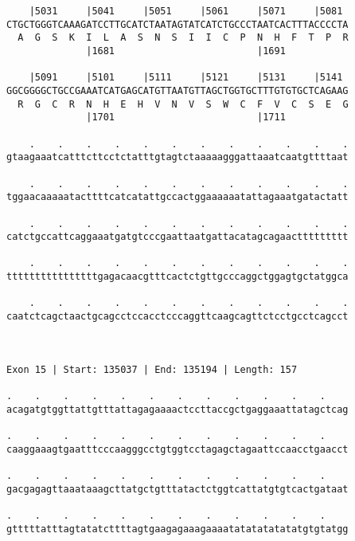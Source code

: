 \documentclass{article}
\begin{document}
\begin{Verbatim}
    |5031     |5041     |5051     |5061     |5071     |5081 
CTGCTGGGTCAAAGATCCTTGCATCTAATAGTATCATCTGCCCTAATCACTTTACCCCTA
  A  G  S  K  I  L  A  S  N  S  I  I  C  P  N  H  F  T  P  R
              |1681                         |1691           
  
    |5091     |5101     |5111     |5121     |5131     |5141 
GGCGGGGCTGCCGAAATCATGAGCATGTTAATGTTAGCTGGTGCTTTGTGTGCTCAGAAG
  R  G  C  R  N  H  E  H  V  N  V  S  W  C  F  V  C  S  E  G
              |1701                         |1711           
  
    .    .    .    .    .    .    .    .    .    .    .    .
gtaagaaatcatttcttcctctatttgtagtctaaaaagggattaaatcaatgttttaat
                                                            
    .    .    .    .    .    .    .    .    .    .    .    .
tggaacaaaaatacttttcatcatattgccactggaaaaaatattagaaatgatactatt
                                                            
    .    .    .    .    .    .    .    .    .    .    .    .
catctgccattcaggaaatgatgtcccgaattaatgattacatagcagaacttttttttt
                                                            
    .    .    .    .    .    .    .    .    .    .    .    .
ttttttttttttttttgagacaacgtttcactctgttgcccaggctggagtgctatggca
                                                            
    .    .    .    .    .    .    .    .    .    .    .    .
caatctcagctaactgcagcctccacctcccaggttcaagcagttctcctgcctcagcct
                                                            
                                                            
 
Exon 15 | Start: 135037 | End: 135194 | Length: 157
 
.    .    .    .    .    .    .    .    .    .    .    .    
acagatgtggttattgtttattagagaaaactccttaccgctgaggaaattatagctcag
                                                            
.    .    .    .    .    .    .    .    .    .    .    .    
caaggaaagtgaatttcccaagggcctgtggtcctagagctagaattccaacctgaacct
                                                            
.    .    .    .    .    .    .    .    .    .    .    .    
gacgagagttaaataaagcttatgctgtttatactctggtcattatgtgtcactgataat
                                                            
.    .    .    .    .    .    .    .    .    .    .    .    
gtttttatttagtatatcttttagtgaagagaaagaaaatatatatatatatgtgtatgg
                                                            

\end{Verbatim}
\end{document}
